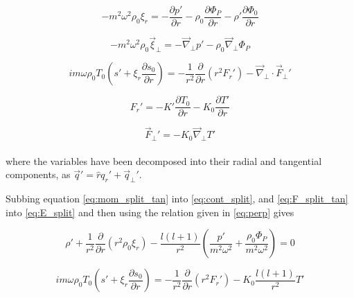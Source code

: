 \documentclass[11pt]{amsart}
\begin{document}
\begin{equation} \label{eq:mom_split_rad}
- m^{2} \omega^{2} \rho_{0} \xi_{r} = - \frac{\partial p'}{\partial r} - \rho_{0} \frac{\partial \Phi_{P}}{\partial r} 
- \rho' \frac{\partial \Phi_{0}}{\partial r}
\end{equation}

\begin{equation} \label{eq:mom_split_tan}
- m^{2} \omega^{2} \rho_{0} \vec{\xi}_{\perp} = - \vec{\nabla}_{\perp} p' - \rho_{0} \vec{\nabla}_{\perp} \Phi_{P} 
\end{equation}

\begin{equation} \label{eq:E_split}
i m \omega \rho_{0} T_{0} \left( s' + \xi_{r} \frac{\partial s_{0}}{\partial r} \right)
= - \frac{1}{r^{2}} \frac{\partial}{\partial r} ( r^{2} F_{r}') - \vec{\nabla}_{\perp} \cdot \vec{F}_{\perp}'
\end{equation}

\begin{equation} \label{eq:F_split_rad}
F_{r}' = - K' \frac{\partial T_{0}}{\partial r} - K_{0} \frac{\partial T'}{\partial r}
\end{equation}

\begin{equation} \label{eq:F_split_tan}
\vec{F}_{\perp}' = - K_{0} \vec{\nabla}_{\perp} T'
\end{equation}
\\
where the variables have been decomposed into their radial and tangential components, as $\vec{q}' = \hat{r} q_{r}' + \vec{q}_{\perp}'$.

Subbing equation \ref{eq:mom_split_tan} into \ref{eq:cont_split}, and \ref{eq:F_split_tan} into \ref{eq:E_split} and then using
the relation given in \ref{eq:perp} gives

\begin{equation} \label{eq:cont_sub}
\rho' + \frac{1}{r^{2}} \frac{\partial}{\partial r} ( r^{2} \rho_{0} \xi_{r} ) - \frac{l (l+1)}{r^{2}} \left( \frac{p'}{m^{2} \omega^{2}} + \frac{\rho_{0} \Phi_{P}}{m^{2} \omega^{2}} \right) = 0
\end{equation}

\begin{equation} \label{eq:E_sub}
i m \omega \rho_{0} T_{0} \left( s' + \xi_{r} \frac{\partial s_{0}}{\partial r} \right)
= - \frac{1}{r^{2}} \frac{\partial}{\partial r} ( r^{2} F_{r}') - K_{0} \frac{l (l+1)}{r^{2}} T'
\end{equation}
\end{document}
